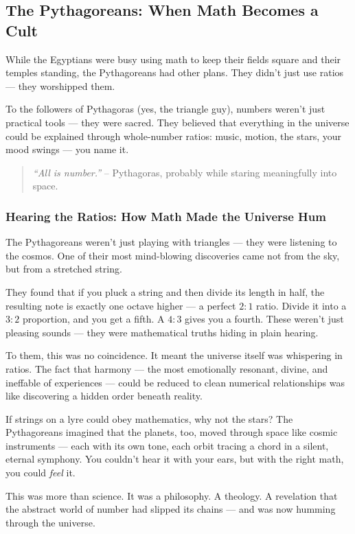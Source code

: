 \subsection{The Pythagoreans: When Math Becomes a Cult}

While the Egyptians were busy using math to keep their fields square and their temples standing, the Pythagoreans had other plans. They didn’t just use ratios — they worshipped them.

To the followers of Pythagoras (yes, the triangle guy), numbers weren’t just practical tools — they were sacred. They believed that everything in the universe could be explained through whole-number ratios: music, motion, the stars, your mood swings — you name it.

\begin{quote}
\textit{“All is number.”} – Pythagoras, probably while staring meaningfully into space.
\end{quote}

\subsubsection*{Hearing the Ratios: How Math Made the Universe Hum}

The Pythagoreans weren’t just playing with triangles — they were listening to the cosmos. One of their most mind-blowing discoveries came not from the sky, but from a stretched string.

They found that if you pluck a string and then divide its length in half, the resulting note is exactly one octave higher — a perfect \(2:1\) ratio. Divide it into a \(3:2\) proportion, and you get a fifth. A \(4:3\) gives you a fourth. These weren’t just pleasing sounds — they were mathematical truths hiding in plain hearing.

To them, this was no coincidence. It meant the universe itself was whispering in ratios. The fact that harmony — the most emotionally resonant, divine, and ineffable of experiences — could be reduced to clean numerical relationships was like discovering a hidden order beneath reality. 

If strings on a lyre could obey mathematics, why not the stars? The Pythagoreans imagined that the planets, too, moved through space like cosmic instruments — each with its own tone, each orbit tracing a chord in a silent, eternal symphony. You couldn't hear it with your ears, but with the right math, you could \textit{feel} it.

This was more than science. It was a philosophy. A theology. A revelation that the abstract world of number had slipped its chains — and was now humming through the universe.

